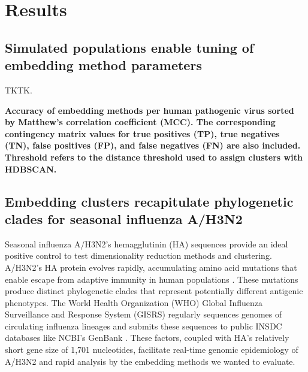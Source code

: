 \documentclass[10pt,letterpaper]{article}
\begin{document}
\section*{Results}

\subsection*{Simulated populations enable tuning of embedding method parameters}

TKTK.

\begin{table}[!ht]
\begin{adjustwidth}{-2.25in}{0in} %
\centering
\caption{
{\bf Accuracy of embedding methods per human pathogenic virus sorted by Matthew's correlation coefficient (MCC). The corresponding contingency matrix values for true positives (TP), true negatives (TN), false positives (FP), and false negatives (FN) are also included. Threshold refers to the distance threshold used to assign clusters with HDBSCAN.}}

\label{table:accuracy}
\end{adjustwidth}
\end{table}

\subsection*{Embedding clusters recapitulate phylogenetic clades for seasonal influenza A/H3N2}

Seasonal influenza A/H3N2's hemagglutinin (HA) sequences provide an ideal positive control to test dimensionality reduction methods and clustering.
A/H3N2's HA protein evolves rapidly, accumulating amino acid mutations that enable escape from adaptive immunity in human populations \cite{flu-review}.
These mutations produce distinct phylogenetic clades that represent potentially different antigenic phenotypes.
The World Health Organization (WHO) Global Influenza Surveillance and Response System (GISRS) regularly sequences genomes of circulating influenza lineages \cite{who-gisrs} and submits these sequences to public INSDC databases like NCBI's GenBank \cite{insdc}.
These factors, coupled with HA's relatively short gene size of 1,701 nucleotides, facilitate real-time genomic epidemiology of A/H3N2 \cite{nextflu,nextstrain} and rapid analysis by the embedding methods we wanted to evaluate.
\end{document}
